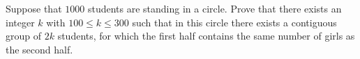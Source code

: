 Suppose that 
$1000$
 students are standing in a circle. Prove that there exists an integer 
$k$
 with 
$100 \leq k \leq 300$
 such that in this circle there exists a contiguous group of 
$2k$
 students, for which the first half contains the same number of girls as the second half.

